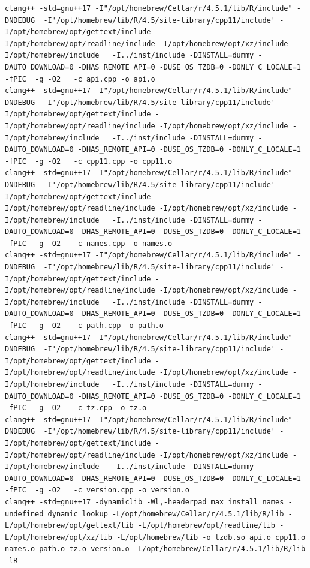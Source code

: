 \documentclass[
  11pt,
]{article}
\newenvironment{rpoutput}{\vspace{0.5em}\begin{snugshade}}{\end{snugshade}}
\begin{document}
\begin{rpoutput}
\begin{verbatim}
clang++ -std=gnu++17 -I"/opt/homebrew/Cellar/r/4.5.1/lib/R/include" -DNDEBUG  -I'/opt/homebrew/lib/R/4.5/site-library/cpp11/include' -I/opt/homebrew/opt/gettext/include -I/opt/homebrew/opt/readline/include -I/opt/homebrew/opt/xz/include -I/opt/homebrew/include   -I../inst/include -DINSTALL=dummy -DAUTO_DOWNLOAD=0 -DHAS_REMOTE_API=0 -DUSE_OS_TZDB=0 -DONLY_C_LOCALE=1 -fPIC  -g -O2   -c api.cpp -o api.o
clang++ -std=gnu++17 -I"/opt/homebrew/Cellar/r/4.5.1/lib/R/include" -DNDEBUG  -I'/opt/homebrew/lib/R/4.5/site-library/cpp11/include' -I/opt/homebrew/opt/gettext/include -I/opt/homebrew/opt/readline/include -I/opt/homebrew/opt/xz/include -I/opt/homebrew/include   -I../inst/include -DINSTALL=dummy -DAUTO_DOWNLOAD=0 -DHAS_REMOTE_API=0 -DUSE_OS_TZDB=0 -DONLY_C_LOCALE=1 -fPIC  -g -O2   -c cpp11.cpp -o cpp11.o
clang++ -std=gnu++17 -I"/opt/homebrew/Cellar/r/4.5.1/lib/R/include" -DNDEBUG  -I'/opt/homebrew/lib/R/4.5/site-library/cpp11/include' -I/opt/homebrew/opt/gettext/include -I/opt/homebrew/opt/readline/include -I/opt/homebrew/opt/xz/include -I/opt/homebrew/include   -I../inst/include -DINSTALL=dummy -DAUTO_DOWNLOAD=0 -DHAS_REMOTE_API=0 -DUSE_OS_TZDB=0 -DONLY_C_LOCALE=1 -fPIC  -g -O2   -c names.cpp -o names.o
clang++ -std=gnu++17 -I"/opt/homebrew/Cellar/r/4.5.1/lib/R/include" -DNDEBUG  -I'/opt/homebrew/lib/R/4.5/site-library/cpp11/include' -I/opt/homebrew/opt/gettext/include -I/opt/homebrew/opt/readline/include -I/opt/homebrew/opt/xz/include -I/opt/homebrew/include   -I../inst/include -DINSTALL=dummy -DAUTO_DOWNLOAD=0 -DHAS_REMOTE_API=0 -DUSE_OS_TZDB=0 -DONLY_C_LOCALE=1 -fPIC  -g -O2   -c path.cpp -o path.o
clang++ -std=gnu++17 -I"/opt/homebrew/Cellar/r/4.5.1/lib/R/include" -DNDEBUG  -I'/opt/homebrew/lib/R/4.5/site-library/cpp11/include' -I/opt/homebrew/opt/gettext/include -I/opt/homebrew/opt/readline/include -I/opt/homebrew/opt/xz/include -I/opt/homebrew/include   -I../inst/include -DINSTALL=dummy -DAUTO_DOWNLOAD=0 -DHAS_REMOTE_API=0 -DUSE_OS_TZDB=0 -DONLY_C_LOCALE=1 -fPIC  -g -O2   -c tz.cpp -o tz.o
clang++ -std=gnu++17 -I"/opt/homebrew/Cellar/r/4.5.1/lib/R/include" -DNDEBUG  -I'/opt/homebrew/lib/R/4.5/site-library/cpp11/include' -I/opt/homebrew/opt/gettext/include -I/opt/homebrew/opt/readline/include -I/opt/homebrew/opt/xz/include -I/opt/homebrew/include   -I../inst/include -DINSTALL=dummy -DAUTO_DOWNLOAD=0 -DHAS_REMOTE_API=0 -DUSE_OS_TZDB=0 -DONLY_C_LOCALE=1 -fPIC  -g -O2   -c version.cpp -o version.o
clang++ -std=gnu++17 -dynamiclib -Wl,-headerpad_max_install_names -undefined dynamic_lookup -L/opt/homebrew/Cellar/r/4.5.1/lib/R/lib -L/opt/homebrew/opt/gettext/lib -L/opt/homebrew/opt/readline/lib -L/opt/homebrew/opt/xz/lib -L/opt/homebrew/lib -o tzdb.so api.o cpp11.o names.o path.o tz.o version.o -L/opt/homebrew/Cellar/r/4.5.1/lib/R/lib -lR

\end{verbatim}
\end{rpoutput}
\end{document}
